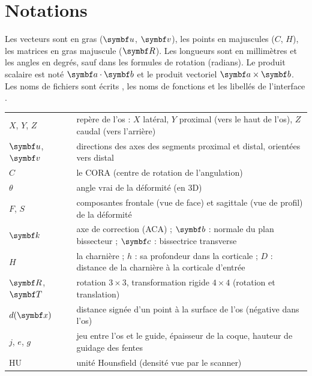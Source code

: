\documentclass[11pt, a4paper, oneside, openany]{report}
\begin{document}
\section*{Notations}

Les vecteurs sont en gras ($\vb{u}$, $\vb{v}$), les points en majuscules ($C$, $H$), les matrices en gras
majuscule ($\mt{R}$). Les longueurs sont en millimètres et les angles en degrés, sauf dans les formules de rotation
(radians). Le produit scalaire est noté $\vb{a}\cdot\vb{b}$ et le produit vectoriel $\vb{a}\times\vb{b}$. Les noms
de fichiers sont écrits , les noms de fonctions  et les libellés de
l'interface .

\begin{table}[H]
\centering\small
\begin{tabularx}{\linewidth}{L{2.6cm}Y}
\toprule
{} &  \\
\midrule
$X$, $Y$, $Z$ & repère de l'os : $X$ latéral, $Y$ proximal (vers le haut de l'os), $Z$ caudal (vers l'arrière) \\
$\vb{u}$, $\vb{v}$ & directions des axes des segments proximal et distal, orientées vers distal \\
$C$ & le CORA (centre de rotation de l'angulation) \\
$\theta$ & angle vrai de la déformité (en 3D) \\
$F$, $S$ & composantes frontale (vue de face) et sagittale (vue de profil) de la déformité \\
$\vb{k}$ & axe de correction (ACA) ; $\vb{b}$ : normale du plan bissecteur ; $\vb{c}$ : bissectrice transverse \\
$H$ & la charnière ; $h$ : sa profondeur dans la corticale ; $D$ : distance de la charnière à la corticale d'entrée \\
$\mt{R}$, $\mt{T}$ & rotation $3\times3$, transformation rigide $4\times4$ (rotation et translation) \\
$d(\vb{x})$ & distance signée d'un point à la surface de l'os (négative dans l'os) \\
$j$, $e$, $g$ & jeu entre l'os et le guide, épaisseur de la coque, hauteur de guidage des fentes \\
HU & unité Hounsfield (densité vue par le scanner) \\
\bottomrule
\end{tabularx}
\end{table}

\tabledesmatieres
\end{document}
